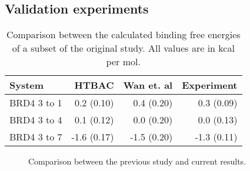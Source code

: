 
\subsection{Validation experiments}

\begin{table}
  \caption{Comparison between the calculated binding free energies of a subset of the original study. All values are in kcal per mol.}
  \label{}

  \begin{tabular}{lrrr}
    \toprule
    System & HTBAC & Wan et. al & Experiment \\
    \midrule
    BRD4 3 to 1 & 0.2 (0.10) &  0.4 (0.20) &  0.3 (0.09) \\
    BRD4 3 to 4 & 0.1 (0.12) &  0.0 (0.20) &  0.0 (0.13) \\
    BRD4 3 to 7 & -1.6 (0.17) & -1.5 (0.20) & -1.3 (0.11) \\
    \bottomrule
  \end{tabular}

\end{table}

\begin{figure}
\caption{Comparison between the previous study and current results.}
\label{fig:comparison}
\end{figure}



